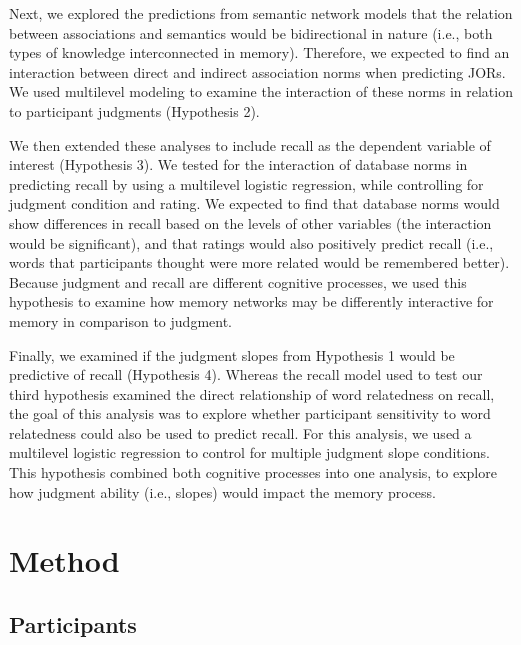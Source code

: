 \documentclass[english,,man]{apa6}
\begin{document}
Next, we explored the predictions from semantic network models that the relation between associations and semantics would be bidirectional in nature (i.e., both types of knowledge interconnected in memory). Therefore, we expected to find an interaction between direct and indirect association norms when predicting JORs. We used multilevel modeling to examine the interaction of these norms in relation to participant judgments (Hypothesis 2).

We then extended these analyses to include recall as the dependent variable of interest (Hypothesis 3). We tested for the interaction of database norms in predicting recall by using a multilevel logistic regression, while controlling for judgment condition and rating. We expected to find that database norms would show differences in recall based on the levels of other variables (the interaction would be significant), and that ratings would also positively predict recall (i.e., words that participants thought were more related would be remembered better). Because judgment and recall are different cognitive processes, we used this hypothesis to examine how memory networks may be differently interactive for memory in comparison to judgment.

Finally, we examined if the judgment slopes from Hypothesis 1 would be predictive of recall (Hypothesis 4). Whereas the recall model used to test our third hypothesis examined the direct relationship of word relatedness on recall, the goal of this analysis was to explore whether participant sensitivity to word relatedness could also be used to predict recall. For this analysis, we used a multilevel logistic regression to control for multiple judgment slope conditions. This hypothesis combined both cognitive processes into one analysis, to explore how judgment ability (i.e., slopes) would impact the memory process.

\hypertarget{method}{%
\section{Method}\label{method}}

\hypertarget{participants}{%
\subsection{Participants}\label{participants}}
\end{document}
